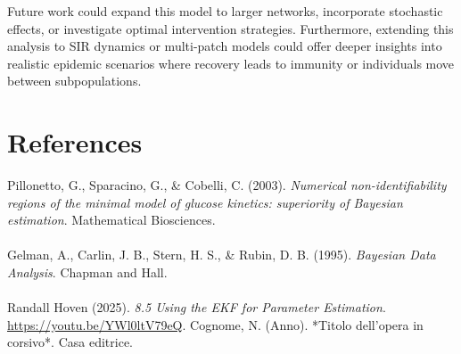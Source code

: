 \documentclass[a4paper,10pt]{report}
\begin{document}
Future work could expand this model to larger networks, incorporate stochastic effects, or investigate optimal intervention strategies. Furthermore, extending this analysis to SIR dynamics or multi-patch models could offer deeper insights into realistic epidemic scenarios where recovery leads to immunity or individuals move between subpopulations.


\section*{References}


Pillonetto, G., Sparacino, G., \& Cobelli, C. (2003).
\textit{Numerical non-identifiability regions of the minimal model of glucose kinetics: superiority of Bayesian estimation}.
Mathematical Biosciences.\\ \\
Gelman, A., Carlin, J. B., Stern, H. S., \& Rubin, D. B. (1995).
\textit{Bayesian Data Analysis}.
Chapman and Hall.\\ \\
Randall Hoven  (2025). \textit{8.5 Using the EKF for Parameter Estimation}. \url{https://youtu.be/YWl0ltV79eQ}.
Cognome, N. (Anno). *Titolo dell'opera in corsivo*. Casa editrice.
\end{document}
